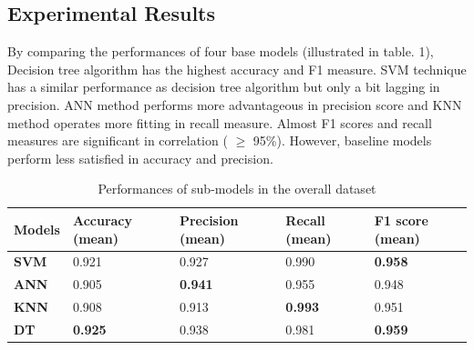 \documentclass[12pt]{article}
\begin{document}
\subsection{Experimental Results}
By comparing the performances of four base models (illustrated in table. 1), Decision tree algorithm has the highest accuracy and F1 measure. SVM technique has a similar performance as decision tree algorithm but only a bit lagging in precision. ANN method performs more advantageous in precision score and KNN method operates more fitting in recall measure. Almost F1 scores and recall measures are significant in correlation ( $\geq$ 95\%). However, baseline models perform less satisfied in accuracy and precision. 
\begin{table}[ht]
\begin{tabular}{|C{2cm}|C{2cm}|C{2cm}|C{2cm}|C{2cm}|}
\hline
{} 
{\color[HTML]{333333} \textbf{Models}} & {\color[HTML]{333333} \textbf{Accuracy (mean)}} & {\color[HTML]{333333} \textbf{Precision (mean)}} & {\color[HTML]{333333} \textbf{Recall (mean)}} & {\color[HTML]{333333} \textbf{F1 score (mean)}} \\ \hline
{} 
\textbf{SVM}  & 0.921  & 0.927 & 0.990  & \textbf{0.958}  \\ \hline
{} 
\textbf{ANN} & 0.905 & \textbf{0.941} & 0.955 & 0.948 \\ \hline
{} 
\textbf{KNN}  & 0.908   & 0.913  & \textbf{0.993}  & 0.951  \\ \hline
{} 
\textbf{DT} & \textbf{0.925}  & 0.938 & 0.981  & \textbf{0.959}  \\ \hline
\end{tabular}
\caption{Performances of sub-models in the overall dataset}
\label{submodels}
\end{table}
\end{document}
